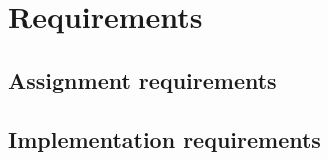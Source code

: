 \documentclass[MiniProjectMain]{subfiles}
\begin{document}
\chapter{Requirements}

\section{Assignment requirements}

\section{Implementation requirements}
\end{document}
